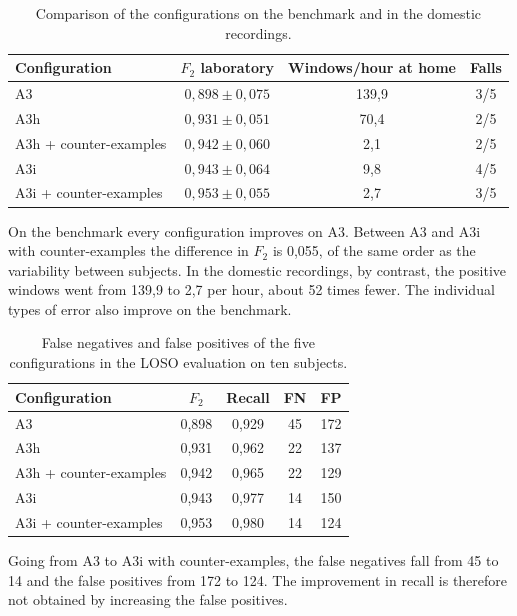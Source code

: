 \begin{table}[ht]
\centering
\caption{Comparison of the configurations on the benchmark and in the domestic recordings.}
\label{tab:configurazioni}
\begin{tabular}{lccc}
\toprule
\textbf{Configuration} &
\textbf{$F_2$ laboratory} &
\textbf{Windows/hour at home} &
\textbf{Falls} \\
\midrule
A3 & $0{,}898\pm0{,}075$ & 139,9 & 3/5 \\
A3h & $0{,}931\pm0{,}051$ & 70,4 & 2/5 \\
A3h + counter-examples & $0{,}942\pm0{,}060$ & 2,1 & 2/5 \\
A3i & $0{,}943\pm0{,}064$ & 9,8 & 4/5 \\
A3i + counter-examples & $0{,}953\pm0{,}055$ & 2,7 & 3/5 \\
\bottomrule
\end{tabular}
\end{table}

On the benchmark every configuration improves on A3. Between A3 and A3i with counter-examples the difference in $F_2$ is 0,055, of the same order as the variability between subjects. In the domestic recordings, by contrast, the positive windows went from 139,9 to 2,7 per hour, about 52 times fewer. The individual types of error also improve on the benchmark.

\begin{table}[ht]
\centering
\caption{False negatives and false positives of the five configurations in the LOSO evaluation on ten subjects.}
\label{tab:errori_configurazioni}
\begin{tabular}{lcccc}
\toprule
\textbf{Configuration} & \textbf{$F_2$} &
\textbf{Recall} & \textbf{FN} & \textbf{FP} \\
\midrule
A3 & 0,898 & 0,929 & 45 & 172 \\
A3h & 0,931 & 0,962 & 22 & 137 \\
A3h + counter-examples & 0,942 & 0,965 & 22 & 129 \\
A3i & 0,943 & 0,977 & 14 & 150 \\
A3i + counter-examples & 0,953 & 0,980 & 14 & 124 \\
\bottomrule
\end{tabular}
\end{table}

Going from A3 to A3i with counter-examples, the false negatives fall from 45 to 14 and the false positives from 172 to 124. The improvement in recall is therefore not obtained by increasing the false positives.

